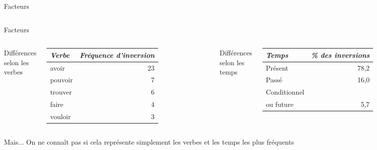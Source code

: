 \documentclass{beamer}
\begin{document}
\begin{frame}[t]{Facteurs}
\begin{columns}
      \end{columns}
    \end{frame}

    \begin{frame}[t]{Facteurs}
      \begin{columns}
          \begin{minipage}[t][0.6\textheight]{\linewidth}
            \begin{block}{}
              Différences selon les verbes\phantom{p}
            \end{block}
            \begin{tabular}{l r}
              \emph{Verbe} & \emph{Fréquence d'inversion} \\
              \hline
              avoir        & 23 \\
              pouvoir      & 7 \\
              trouver      & 6 \\
              faire        & 4 \\
              vouloir      & 3
            \end{tabular}
          \end{minipage}
          \begin{minipage}[t][0.6\textheight]{\linewidth}
            \begin{block}{}
              Différences selon les temps
            \end{block}
            \begin{tabular}{l r}
              \emph{Temps} & \emph{\% des inversions} \\
              \hline
              Présent      & 78,2 \\
              Passé        & 16,0 \\
              Conditionnel & \\
              ou future    & 5,7
            \end{tabular}
          \end{minipage}
      \end{columns}
      \begin{block}{Mais...}
        On ne connaît pas si cela représente simplement les verbes et les temps les plus fréquents
      \end{block}
    \end{frame}
\end{document}
